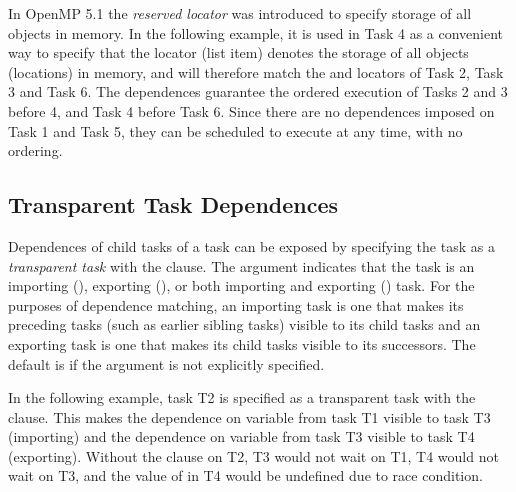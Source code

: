 In OpenMP 5.1 the  \emph{reserved locator} was introduced
to specify storage of all objects in memory. In the following example,
it is used in Task 4 as a convenient way to specify that the locator
(list item) denotes the storage of all objects (locations) in memory, and 
will therefore match the  and  locators of Task 2, Task 3 and Task 6.
The dependences guarantee the ordered execution of Tasks 2 and 3 before 4, and
Task 4 before Task 6.
Since there are no dependences imposed on Task 1 and Task 5, they can be
scheduled to execute at any time, with no ordering.


\subsection{Transparent Task Dependences}
\label{subsec:depend_trans_task}

Dependences of child tasks of a task can be exposed by specifying 
the task as a \emph{transparent task} with the 
 clause.
The  argument indicates that the task is 
an importing (), exporting (),
or both importing and exporting () task.
For the purposes of dependence matching, an importing task is 
one that makes its preceding tasks (such as earlier
sibling tasks) visible to its child tasks and an exporting task
is one that makes its child tasks visible to its successors.
The default is  if the argument is not explicitly specified.

In the following example, task T2 is specified as a transparent task
with the  clause. This makes the dependence on
variable  from task T1 visible to task T3 (importing) and 
the dependence on variable  from task T3 visible to task T4
(exporting).  Without the  clause on T2, T3 would not
wait on T1, T4 would not wait on T3, and the value of  in T4 
would be undefined due to race condition.


